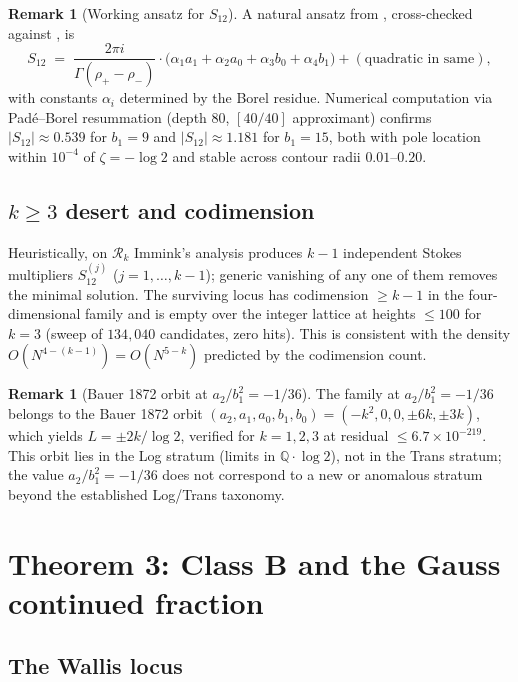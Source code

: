 \documentclass[11pt,a4paper]{article}
\theoremstyle{definition}
\newtheorem{remark}[theorem]{Remark}
\begin{document}
\begin{remark}[Working ansatz for $S_{12}$]
A natural ansatz from \cite{immink1984}, cross-checked against \cite{braaksma-faber1996}, is
\[
  S_{12} \;=\; \frac{2\pi i}{\Gamma(\rho_+ - \rho_-)}\cdot\bigl(\alpha_1 a_1 + \alpha_2 a_0 + \alpha_3 b_0 + \alpha_4 b_1\bigr) + (\text{quadratic in same}),
\]
with constants $\alpha_i$ determined by the Borel residue. Numerical computation via Pad\'e--Borel resummation (depth $80$, $[40/40]$ approximant) confirms $|S_{12}| \approx 0.539$ for $b_1 = 9$ and $|S_{12}| \approx 1.181$ for $b_1 = 15$, both with pole location within $10^{-4}$ of $\zeta = -\log 2$ and stable across contour radii $0.01$--$0.20$.
\end{remark}

\subsection{$k\ge 3$ desert and codimension}

Heuristically, on $\mathcal{R}_k$ Immink's analysis produces $k-1$ independent Stokes multipliers $S_{12}^{(j)}$ ($j=1,\ldots,k-1$); generic vanishing of any one of them removes the minimal solution. The surviving locus has codimension $\ge k-1$ in the four-dimensional family and is empty over the integer lattice at heights $\le 100$ for $k=3$ (sweep of $134{,}040$ candidates, zero hits). This is consistent with the density $O(N^{4-(k-1)}) = O(N^{5-k})$ predicted by the codimension count.

\begin{remark}[Bauer 1872 orbit at $a_2/b_1^2 = -1/36$]\label{rem:bauer-orbit}
The family at $a_2/b_1^2 = -1/36$ belongs to the
Bauer 1872 orbit $(a_2, a_1, a_0, b_1, b_0) =
(-k^2, 0, 0, \pm 6k, \pm 3k)$, which yields
$L = \pm 2k/\!\log 2$, verified for $k=1,2,3$ at
residual $\leq 6.7\times10^{-219}$. This orbit
lies in the Log stratum (limits in
$\mathbb{Q}\cdot\log 2$), not in the Trans stratum;
the value $a_2/b_1^2 = -1/36$ does not correspond
to a new or anomalous stratum beyond the established
Log/Trans taxonomy.
\end{remark}

\section{Theorem 3: Class B and the Gauss continued fraction}\label{sec:classB}

\subsection{The Wallis locus}
\end{document}
